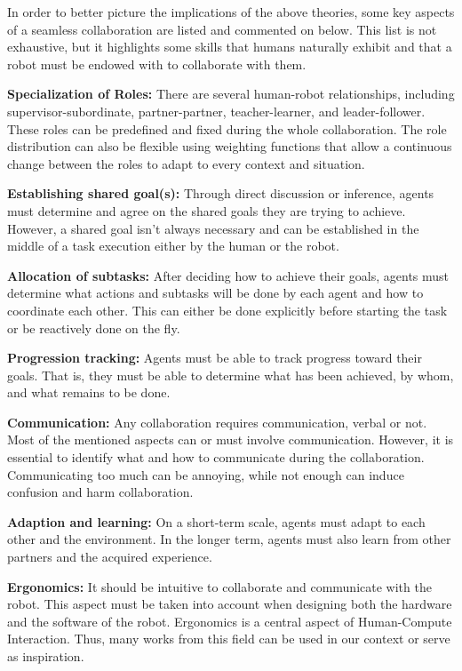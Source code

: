 
In order to better picture the implications of the above theories, some key aspects of a seamless collaboration are listed and commented on below. This list is not exhaustive, but it highlights some skills that humans naturally exhibit and that a robot must be endowed with to collaborate with them. 

\textbf{Specialization of Roles:} There are several human-robot relationships, including supervisor-subordinate, partner-partner, teacher-learner, and leader-follower. These roles can be predefined and fixed during the whole collaboration. The role distribution can also be flexible using weighting functions that allow a continuous change between the roles to adapt to every context and situation.

\textbf{Establishing shared goal(s):} Through direct discussion or inference, agents must determine and agree on the shared goals they are trying to achieve. However, a shared goal isn't always necessary and can be established in the middle of a task execution either by the human or the robot.

\textbf{Allocation of subtasks:} After deciding how to achieve their goals, agents must determine what actions and subtasks will be done by each agent and how to coordinate each other. This can either be done explicitly before starting the task or be reactively done on the fly.

\textbf{Progression tracking:} Agents must be able to track progress toward their goals. That is, they must be able to determine what has been achieved, by whom, and what remains to be done. 

\textbf{Communication:} Any collaboration requires communication, verbal or not. Most of the mentioned aspects can or must involve communication. However, it is essential to identify what and how to communicate during the collaboration. Communicating too much can be annoying, while not enough can induce confusion and harm collaboration.

\textbf{Adaption and learning:} On a short-term scale, agents must adapt to each other and the environment. In the longer term, agents must also learn from other partners and the acquired experience.

\textbf{Ergonomics:} It should be intuitive to collaborate and communicate with the robot. This aspect must be taken into account when designing both the hardware and the software of the robot. Ergonomics is a central aspect of Human-Compute Interaction. Thus, many works from this field can be used in our context or serve as inspiration.

